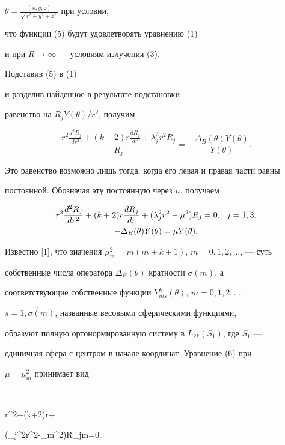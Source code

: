 $\theta=\frac{(x,y,z)}{\sqrt{x^2+y^2+z^2}}$ при условии,


что функции (5) будут удовлетворять уравнению (1) 


и при $R\to \infty$ --- условиям излучения (3).


Подставив (5) в (1)


и разделив найденное в результате подстановки


равенство на $R_j Y(\theta)/r^2$, получим


$$


\frac{r^2\frac{d^2R_j}{dr^2}+(k+2)r\frac{dR_j}{dr}+\lambda_j^2r^2R_j}{R_j}=


-\frac{\Delta_B(\theta)Y(\theta)}{Y(\theta)}.


$$


Это равенство возможно лишь тогда, когда его левая и правая части равны 


постоянной. Обозначая эту постоянную через $\mu$, получаем


\begin{gather}


r^2\frac{d^2R_j}{dr^2}+(k+2)r\frac{dR_j}{dr}+(\lambda_j^2r^2-\mu^2)R_j=0,  


\ \ j=\overline{1, 3}, \\


%


-\Delta_B(\theta)Y(\theta)=\mu Y(\theta).\notag


\end{gather}





Известно [1], что значения $\mu_m^2=m(m+k+1)$, $m=0,1,2,\dotsc$, --- суть 


собственные числа оператора $\Delta_B(\theta)$ кратности $\sigma(m)$, а 


соответствующие собственные функции $Y_{ms}^k(\theta)$, $m=0,1,2,\dotsc$,


$s=\overline{1,\sigma(m)}$, названные весовыми сферическими функциями, 


образуют полную ортонормированную систему в $L_{2k}(S_1)$, где $S_1$ ---


единичная сфера с центром в начале координат. Уравнение (6) при 


$\mu=\mu_m^2$ принимает вид


$$


r^2+(k+2)r+


(\lambda_j^2r^2-\mu_m^2)R_{jm}=0.


